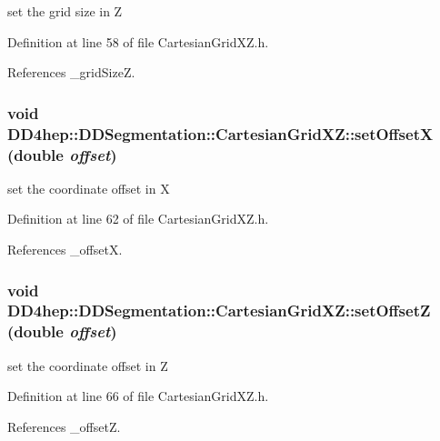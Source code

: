 set the grid size in Z 

Definition at line 58 of file CartesianGridXZ.h.

References \_\-gridSizeZ.\hypertarget{class_d_d4hep_1_1_d_d_segmentation_1_1_cartesian_grid_x_z_abc7142a9cda0a6eb682d4eea9e5eae7a}{
\subsubsection[{setOffsetX}]{\setlength{\rightskip}{0pt plus 5cm}void DD4hep::DDSegmentation::CartesianGridXZ::setOffsetX (double {\em offset})}}
\label{class_d_d4hep_1_1_d_d_segmentation_1_1_cartesian_grid_x_z_abc7142a9cda0a6eb682d4eea9e5eae7a}


set the coordinate offset in X 

Definition at line 62 of file CartesianGridXZ.h.

References \_\-offsetX.\hypertarget{class_d_d4hep_1_1_d_d_segmentation_1_1_cartesian_grid_x_z_a45d273f0fcb485427d30c465477f4c61}{
\subsubsection[{setOffsetZ}]{\setlength{\rightskip}{0pt plus 5cm}void DD4hep::DDSegmentation::CartesianGridXZ::setOffsetZ (double {\em offset})}}
\label{class_d_d4hep_1_1_d_d_segmentation_1_1_cartesian_grid_x_z_a45d273f0fcb485427d30c465477f4c61}


set the coordinate offset in Z 

Definition at line 66 of file CartesianGridXZ.h.

References \_\-offsetZ.

